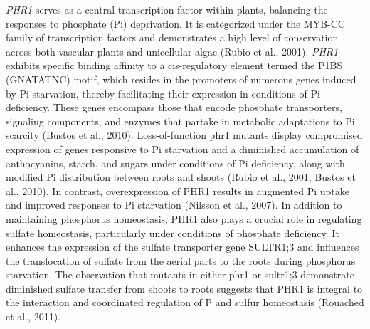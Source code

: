 \documentclass[10pt,letterpaper]{article}
\begin{document}
\begin{itemize}
\textit{PHR1} serves as a central transcription factor within plants, balancing the responses to phosphate (Pi) deprivation. It is categorized under the MYB-CC family of transcription factors and demonstrates a high level of conservation across both vascular plants and unicellular algae (Rubio et al., 2001). \textit{PHR1} exhibits specific binding affinity to a cis-regulatory element termed the P1BS (GNATATNC) motif, which resides in the promoters of numerous genes induced by Pi starvation, thereby facilitating their expression in conditions of Pi deficiency. These genes encompass those that encode phosphate transporters, signaling components, and enzymes that partake in metabolic adaptations to Pi scarcity (Bustos et al., 2010). Loss-of-function phr1 mutants display compromised expression of genes responsive to Pi starvation and a diminished accumulation of anthocyanins, starch, and sugars under conditions of Pi deficiency, along with modified Pi distribution between roots and shoots (Rubio et al., 2001; Bustos et al., 2010). In contrast, overexpression of PHR1 results in augmented Pi uptake and improved responses to Pi starvation (Nilsson et al., 2007). In addition to maintaining phosphorus homeostasis, PHR1 also plays a crucial role in regulating sulfate homeostasis, particularly under conditions of phosphate deficiency. It enhances the expression of the sulfate transporter gene SULTR1;3 and influences the translocation of sulfate from the aerial parts to the roots during phosphorus starvation. The observation that mutants in either phr1 or sultr1;3 demonstrate diminished sulfate transfer from shoots to roots suggests that PHR1 is integral to the interaction and coordinated regulation of P and sulfur homeostasis (Rouached et al., 2011). 





\end{itemize}
\end{document}
